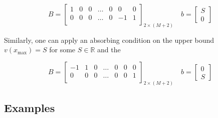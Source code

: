 \documentclass[11pt]{article}
\theoremstyle{definition}
\begin{document}
\begin{equation}\label{eq:absorbing-barrier-matrix}
B = \begin{bmatrix}
1 & 0 & 0 & \dots & 0 & 0 & 0 \\
0 & 0 & 0 & \dots & 0 & -1 & 1\\
\end{bmatrix}_{2 \times (M+2)} \quad
b = \begin{bmatrix}
S \\
0
\end{bmatrix}
\end{equation}

Similarly, one can apply an absorbing condition on the upper bound  $v(x_{\max}) =S$ for some $S \in \mathbb{R}$ and the


\begin{equation}\label{eq:absorbing-barrier-matrix-ub}
B = \begin{bmatrix}
-1 & 1 & 0 & \dots & 0 & 0 & 0 \\
0 & 0 & 0 & \dots & 0 & 0 & 1\\
\end{bmatrix}_{2 \times (M+2)} \quad
b = \begin{bmatrix}
0 \\
S
\end{bmatrix}
\end{equation}


\subsection{Examples}
\end{document}
